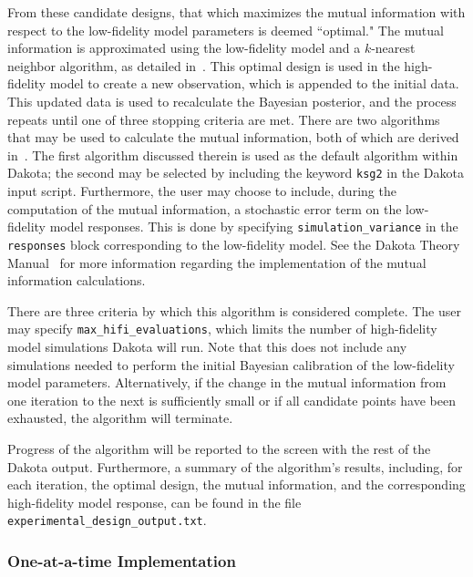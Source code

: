 From these candidate designs, that which maximizes the mutual information with
respect to the low-fidelity model parameters is deemed ``optimal." The mutual
information is approximated using the low-fidelity model and a $k$-nearest
neighbor algorithm, as detailed in~\cite{Lew16}. This optimal design is used in 
the high-fidelity model to create a new observation, which is appended to the 
initial data. This updated data is used to recalculate the Bayesian posterior,
and the process repeats until one of three stopping criteria are met.
There are two algorithms that may be used to calculate the mutual information,
both of which are derived in~\cite{Kra04}. The first algorithm discussed 
therein is used as the default algorithm within Dakota; the second may be 
selected by including the keyword \texttt{ksg2} in the Dakota input script. 
Furthermore, the user may choose to include, during the computation of the 
mutual information, a stochastic error term on the low-fidelity model 
responses. This is done by specifying \texttt{simulation\_variance} in the 
\texttt{responses} block corresponding to the low-fidelity model. See the 
Dakota Theory Manual~\cite{TheoMan} for more information regarding the 
implementation of the mutual information calculations.

There are three criteria by which this algorithm is considered complete. 
The user may specify \texttt{max\_hifi\_evaluations}, which limits the number 
of high-fidelity model simulations Dakota will run. Note that this does not 
include any simulations needed to perform the initial Bayesian calibration of 
the low-fidelity model parameters. Alternatively, if the change in the mutual 
information from one iteration to the next is sufficiently small or if all 
candidate points have been exhausted, the algorithm will terminate. 

Progress of the algorithm will be reported to the screen with the rest of the
Dakota output. Furthermore, a summary of the algorithm's results, including, 
for each iteration, the optimal design, the mutual information, and the 
corresponding high-fidelity model response, can be found in the file 
\texttt{experimental\_design\_output.txt}.  

\subsubsection{One-at-a-time Implementation}

